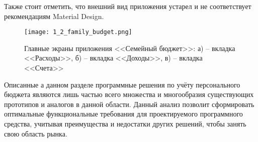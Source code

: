 Также стоит отметить, что внешний вид приложения устарел и не соответствует рекомендациям Material Design.

\begin{figure}
    \centering
    \texttt{[image: 1\_2\_family\_budget.png]}
    \caption{Главные экраны приложения <<Семейный бюджет>>: а) -- вкладка <<Расходы>>, б) -- вкладка <<Доходы>>, в) -- вкладка <<Счета>>}
    \label{fig:analysis:analogues:family_budget}
\end{figure}

Описанные а данном разделе программные решения по учёту персонального бюджета являются лишь частью всего множества и многообразия существующих прототипов и аналогов в данной области.
Данный анализ позволит сформировать оптимальные функциональные требования для проектируемого программного средства, учитывая преимущества и недостатки других решений, чтобы занять свою область рынка.
